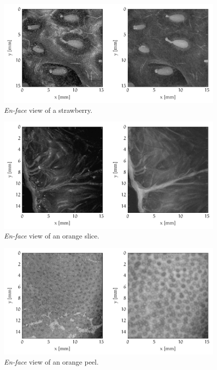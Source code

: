 \begin{figure}[hbt]
	\centering
	\includegraphics[width=\linewidth]{gfx/ch4/axsun/enface/strawberry-surf}
	\caption{\emph{En-face} view of a strawberry.}\label{fig:strawberry-surf}
\end{figure}

\begin{figure}[hbt]
	\centering
	\includegraphics[width=\linewidth]{gfx/ch4/axsun/enface/orange-surf}
	\caption{\emph{En-face} view of an orange slice.}\label{fig:orange-surf}
\end{figure}


\begin{figure}[hbt]
	\centering
	\includegraphics[width=\linewidth]{gfx/ch4/axsun/enface/orange-peel-surf}
	\caption{\emph{En-face} view of an orange peel.}\label{fig:orange-peel-surf}
\end{figure}


